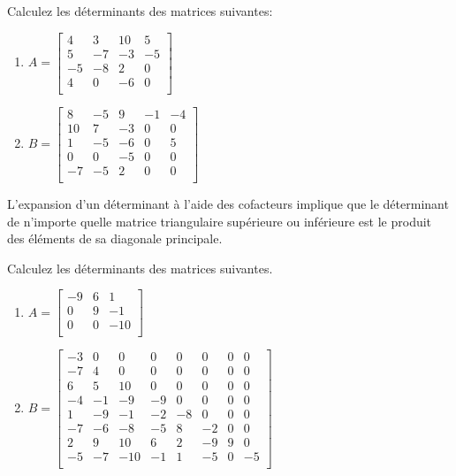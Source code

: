 \documentclass[]{book}
\providecommand{\tightlist}{%
  \setlength{\itemsep}{0pt}\setlength{\parskip}{0pt}}
\theoremstyle{definition}
\theoremstyle{definition}
\theoremstyle{definition}
\theoremstyle{remark}
\let\BeginKnitrBlock\begin \let\EndKnitrBlock\end
\begin{document}
\BeginKnitrBlock{example}
\protect\hypertarget{exm:unnamed-chunk-96}{}{\label{exm:unnamed-chunk-96} }Calculez les déterminants des matrices suivantes:

\begin{enumerate}
\def\labelenumi{\alph{enumi}.}
\tightlist
\item
  \(A=\begin{bmatrix} 4&3&10&5\\ 5&-7&-3&-5\\ -5&-8&2&0\\ 4&0&-6&0\\ \end{bmatrix}\)
\item
  \(B=\begin{bmatrix} 8&-5&9&-1&-4\\ 10&7&-3&0&0\\ 1&-5&-6&0&5\\ 0&0&-5&0&0\\ -7&-5&2&0&0\\ \end{bmatrix}\)
\end{enumerate}
\EndKnitrBlock{example}

\BeginKnitrBlock{remark}
{}L'expansion d'un déterminant à l'aide des cofacteurs implique que le déterminant de n'importe quelle matrice triangulaire supérieure ou inférieure est le produit des éléments de sa diagonale principale.
\EndKnitrBlock{remark}

\BeginKnitrBlock{example}
\protect\hypertarget{exm:unnamed-chunk-98}{}{\label{exm:unnamed-chunk-98} }Calculez les déterminants des matrices suivantes.

\begin{enumerate}
\def\labelenumi{\alph{enumi}.}
\tightlist
\item
  \(A=\begin{bmatrix} -9&6&1\\ 0&9&-1\\ 0&0&-10\\ \end{bmatrix}\)
\item
  \(B=\begin{bmatrix} -3&0&0&0&0&0&0&0\\ -7&4&0&0&0&0&0&0\\ 6&5&10&0&0&0&0&0\\ -4&-1&-9&-9&0&0&0&0\\ 1&-9&-1&-2&-8&0&0&0\\ -7&-6&-8&-5&8&-2&0&0\\ 2&9&10&6&2&-9&9&0\\ -5&-7&-10&-1&1&-5&0&-5\\ \end{bmatrix}\)
\end{enumerate}
\EndKnitrBlock{example}
\end{document}

